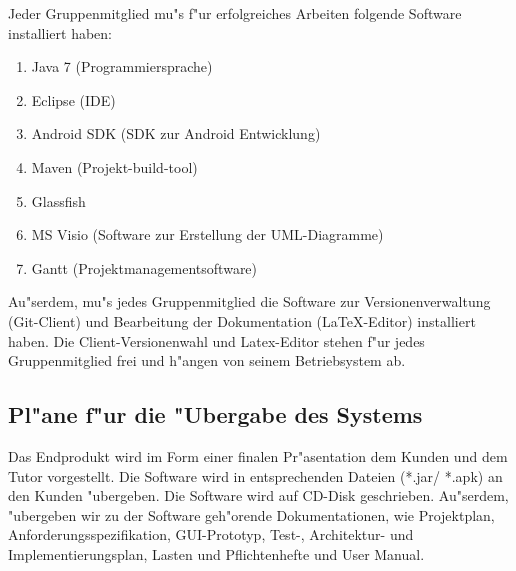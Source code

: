 Jeder Gruppenmitglied mu"s f"ur erfolgreiches Arbeiten folgende Software installiert haben:
\begin{enumerate}
 \item Java 7 (Programmiersprache)
 \item Eclipse (IDE)
 \item Android SDK (SDK zur Android Entwicklung)
 \item Maven (Projekt-build-tool)
 \item Glassfish 
 \item MS Visio (Software zur Erstellung der UML-Diagramme)
 \item Gantt (Projektmanagementsoftware)
\end{enumerate}
Au"serdem, mu"s jedes Gruppenmitglied die Software zur Versionenverwaltung (Git-Client) und Bearbeitung der Dokumentation (LaTeX-Editor) installiert haben. Die Client-Versionenwahl und Latex-Editor stehen f"ur jedes Gruppenmitglied frei und h"angen von seinem Betriebsystem ab.

\subsection{Pl"ane f"ur die "Ubergabe des Systems}
Das Endprodukt wird im Form einer finalen Pr"asentation dem Kunden und dem Tutor vorgestellt.
Die Software wird in entsprechenden Dateien (*.jar/ *.apk) an den Kunden "ubergeben. Die Software wird auf CD-Disk geschrieben. Au"serdem, "ubergeben wir zu der Software geh"orende Dokumentationen, wie Projektplan, Anforderungsspezifikation, GUI-Prototyp, Test-, Architektur- und Implementierungsplan, Lasten und Pflichtenhefte und User Manual.


